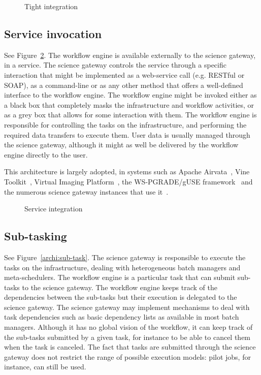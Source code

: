 \documentclass[preprint,3p,twocolumn]{elsarticle}
\begin{document}
\begin{figure}
\centering
\def\svgwidth{0.5\columnwidth}

\caption{Tight integration}
\label{archi:tight}
\end{figure}

\subsection{Service invocation}

See Figure~\ref{archi:service}. The workflow engine is available
externally to the science gateway, in a service. The science gateway
controls the service through a specific interaction that might be
implemented as a web-service call (e.g. RESTful or SOAP), as a
command-line or as any other method that offers a well-defined
interface to the workflow engine. The workflow engine might be invoked
either as a black box that completely masks the infrastructure and
workflow activities, or as a grey box that allows for some interaction
with them.  The workflow engine is responsible for controlling the
tasks on the infrastructure, and performing the required data
transfers to execute them. User data is usually managed through the
science gateway, although it might as well be delivered by the
workflow engine directly to the user.

This architecture is largely adopted, in systems such as Apache
Airvata~\cite{marru2011apache}, Vine
Toolkit~\cite{DBLP:journals/scpe/SzejnfeldDKKKKLPTWDNW10}, Virtual
Imaging Platform~\cite{GLAT-13}, the WS-PGRADE/gUSE
framework~\cite{Kacsuk2012} and the numerous science gateway instances
that use it~\cite{kacsuk2014science}.
\begin{figure}
\centering
\def\svgwidth{0.5\columnwidth}

\caption{Service integration}
\label{archi:service}
\end{figure}

\subsection{Sub-tasking}

See Figure~\ref{archi:sub-task}. The science gateway is responsible to
execute the tasks on the infrastructure, dealing with heterogeneous
batch managers and meta-schedulers. The workflow engine is a
particular task that can submit sub-tasks to the science gateway. The
workflow engine keeps track of the dependencies between the sub-tasks
but their execution is delegated to the science gateway. The science
gateway may implement mechanisms to deal with task dependencies such
as basic dependency lists as available in most batch
managers. Although it has no global vision of the workflow, it can
keep track of the sub-tasks submitted by a given task, for instance to
be able to cancel them when the task is canceled. The fact that tasks
are submitted through the science gateway does not restrict the range
of possible execution models: pilot jobs, for instance, can still be
used.
\end{document}
